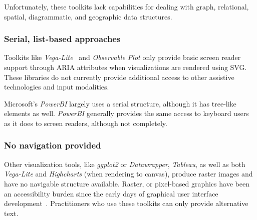 \documentclass[12pt]{cmuthesis}
\newcommand{\ea}{{et~al\xperiod}\xspace}
\begin{document}
Unfortunately, these toolkits lack capabilities for dealing with graph, relational, spatial, diagrammatic, and geographic data structures.

\subsubsection{Serial, list-based approaches}
Toolkits like \textit{Vega-Lite}~\cite{Satyanarayan2017VegaLite} and \textit{Observable Plot} only provide basic screen reader support through ARIA attributes when visualizations are rendered using SVG. These libraries do not currently provide additional access to other assistive technologies and input modalities.

Microsoft's \textit{PowerBI} largely uses a serial structure, although it has tree-like elements as well. \textit{PowerBI} generally provides the same access to keyboard users as it does to screen readers, although not completely.

\subsubsection{No navigation provided}
Other visualization tools, like \textit{ggplot2} or \textit{Datawrapper}, \textit{Tableau}, as well as both \textit{Vega-Lite} and \textit{Highcharts} (when rendering to canvas), produce raster images and have no navigable structure available. Raster, or pixel-based graphics have been an accessibility burden since the early days of graphical user interface development~\cite{Boyd1990Graphical}. Practitioners who use these toolkits can only provide alternative text.


\end{document}
